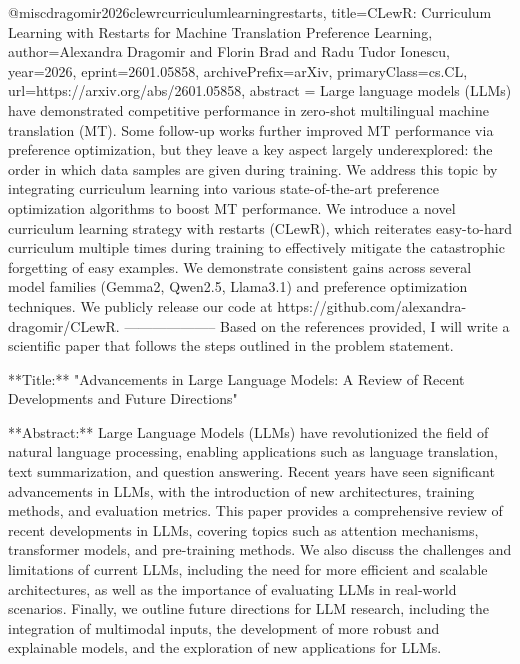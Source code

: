 {}@misc{dragomir2026clewrcurriculumlearningrestarts,
      title={CLewR: Curriculum Learning with Restarts for Machine Translation Preference Learning}, 
      author={Alexandra Dragomir and Florin Brad and Radu Tudor Ionescu},
      year={2026},
      eprint={2601.05858},
      archivePrefix={arXiv},
      primaryClass={cs.CL},
      url={https://arxiv.org/abs/2601.05858},
      abstract = {Large language models (LLMs) have demonstrated competitive performance in zero-shot multilingual machine translation (MT). Some follow-up works further improved MT performance via preference optimization, but they leave a key aspect largely underexplored: the order in which data samples are given during training. We address this topic by integrating curriculum learning into various state-of-the-art preference optimization algorithms to boost MT performance. We introduce a novel curriculum learning strategy with restarts (CLewR), which reiterates easy-to-hard curriculum multiple times during training to effectively mitigate the catastrophic forgetting of easy examples. We demonstrate consistent gains across several model families (Gemma2, Qwen2.5, Llama3.1) and preference optimization techniques. We publicly release our code at https://github.com/alexandra-dragomir/CLewR.}
}
        --------------------
         Based on the references provided, I will write a scientific paper that follows the steps outlined in the problem statement.

        **Title:** "Advancements in Large Language Models: A Review of Recent Developments and Future Directions"

        **Abstract:**
Large Language Models (LLMs) have revolutionized the field of natural language processing, enabling applications such as language translation, text summarization, and question answering. Recent years have seen significant advancements in LLMs, with the introduction of new architectures, training methods, and evaluation metrics. This paper provides a comprehensive review of recent developments in LLMs, covering topics such as attention mechanisms, transformer models, and pre-training methods. We also discuss the challenges and limitations of current LLMs, including the need for more efficient and scalable architectures, as well as the importance of evaluating LLMs in real-world scenarios. Finally, we outline future directions for LLM research, including the integration of multimodal inputs, the development of more robust and explainable models, and the exploration of new applications for LLMs.

